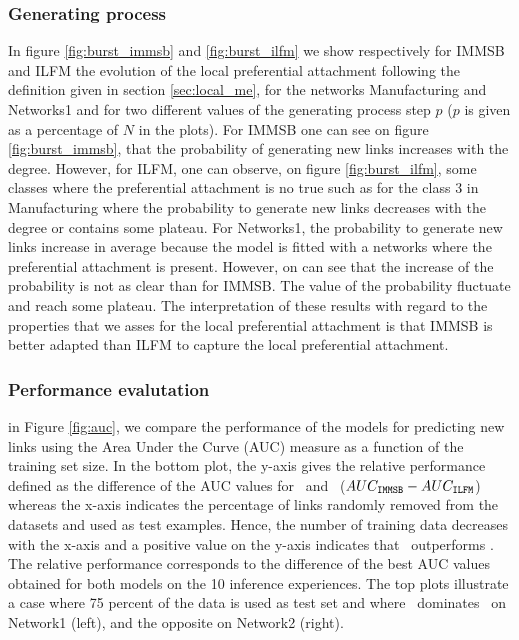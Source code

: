 


\subsubsection{Generating process}
In figure \ref{fig:burst_immsb} and \ref{fig:burst_ilfm} we show respectively for IMMSB and ILFM the evolution of the local preferential attachment following the definition given in section \ref{sec:local_me}, for the networks Manufacturing and Networks1 and for two different values of the generating process step $p$ ($p$ is given as a percentage of $N$ in the plots). For IMMSB one can see on figure \ref{fig:burst_immsb}, that the probability of generating new links increases with the degree. However, for ILFM, one can observe, on figure \ref{fig:burst_ilfm}, some classes where the preferential attachment is no true such as for the class 3 in Manufacturing where the probability to generate new links decreases with the degree or contains some plateau. For Networks1, the probability to generate new links increase in average because the model is fitted with a networks where the preferential attachment is present. However, on can see that the increase of the probability is not as clear than for IMMSB. The value of the probability fluctuate and reach some plateau. The interpretation of these results with regard to the properties that we asses for the local preferential attachment is that IMMSB is better adapted than ILFM to capture the local preferential attachment.


\begin{figure}[h]
\centering

\end{figure}

\begin{figure}[h]
\centering

\end{figure}

\subsubsection{Performance evalutation}


in Figure \ref{fig:auc}, we compare the performance of the models for predicting new links using the Area Under the Curve (AUC) measure as a function of the training set size. In the bottom plot, the y-axis gives the relative performance defined as the difference of the AUC values for \imb\ and \ifm\ ($AUC_{\texttt{IMMSB}} - AUC_{\texttt{ILFM}}$) whereas the x-axis indicates the percentage of links randomly removed from the datasets and used as test examples. Hence, the number of training data decreases with the x-axis and a positive value on the y-axis indicates that \imb\ outperforms \ifm.  The relative performance corresponds to the difference of the best AUC values obtained for both models on the 10 inference experiences. The top plots illustrate a case where 75 percent of the data is used as test set and where \imb\ dominates \ifm\ on Network1 (left), and the opposite on Network2 (right).

